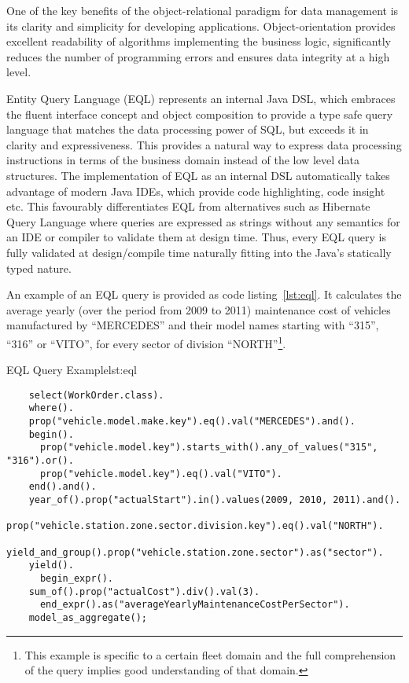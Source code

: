   One of the key benefits of the object-relational paradigm for data management is its clarity and simplicity for developing applications.
  Object-orientation provides excellent readability of algorithms implementing the business logic, significantly reduces the number of programming errors and ensures data integrity at a high level.
  
  Entity Query Language (EQL) represents an internal Java DSL, which embraces the fluent interface concept and object composition to provide a type safe query language that matches the data processing power of SQL, but exceeds it in clarity and expressiveness.
  This provides a natural way to express data processing instructions in terms of the business domain instead of the low level data structures.
  The implementation of EQL as an internal DSL automatically takes advantage of modern Java IDEs, which provide code highlighting, code insight etc.
  This favourably differentiates EQL from alternatives such as Hibernate Query Language where queries are expressed as strings without any semantics for an IDE or compiler to validate them at design time.
  Thus, every EQL query is fully validated at design/compile time naturally fitting into the Java's statically typed nature.
  
  An example of an EQL query is provided as code listing~\ref{lst:eql}.  
  It calculates the average yearly (over the period from 2009 to 2011) maintenance cost of vehicles manufactured by ``MERCEDES'' and their model names starting with ``315'', ``316'' or ``VITO'', for every sector of division ``NORTH''\footnote{This example is specific to a certain fleet domain and the full comprehension of the query implies good understanding of that domain.}.  

  \begin{code}{EQL Query Example}{lst:eql}
  \begin{lstlisting}
    select(WorkOrder.class).
    where().
    prop("vehicle.model.make.key").eq().val("MERCEDES").and().
    begin().
      prop("vehicle.model.key").starts_with().any_of_values("315", "316").or().
      prop("vehicle.model.key").eq().val("VITO").
    end().and().
    year_of().prop("actualStart").in().values(2009, 2010, 2011).and().
    prop("vehicle.station.zone.sector.division.key").eq().val("NORTH").
    yield_and_group().prop("vehicle.station.zone.sector").as("sector").
    yield().
      begin_expr().
	sum_of().prop("actualCost").div().val(3).
      end_expr().as("averageYearlyMaintenanceCostPerSector").
    model_as_aggregate();
  \end{lstlisting}
  \end{code}
  
